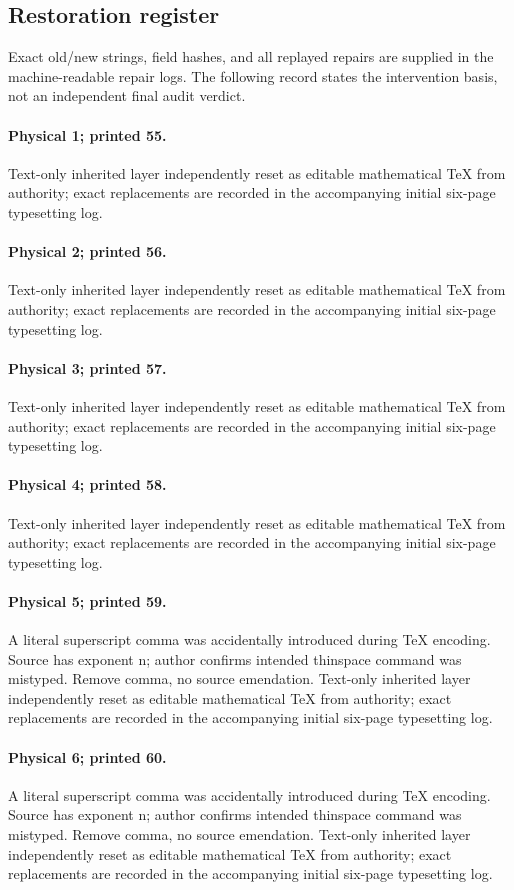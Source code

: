 \documentclass[10pt,a4paper]{article}
\begin{document}
\subsection*{Restoration register}
\noindent Exact old/new strings, field hashes, and all replayed repairs are supplied in the machine-readable repair logs. The following record states the intervention basis, not an independent final audit verdict.\par
\paragraph{Physical 1; printed 55.} Text-only inherited layer independently reset as editable mathematical TeX from authority; exact replacements are recorded in the accompanying initial six-page typesetting log.
\paragraph{Physical 2; printed 56.} Text-only inherited layer independently reset as editable mathematical TeX from authority; exact replacements are recorded in the accompanying initial six-page typesetting log.
\paragraph{Physical 3; printed 57.} Text-only inherited layer independently reset as editable mathematical TeX from authority; exact replacements are recorded in the accompanying initial six-page typesetting log.
\paragraph{Physical 4; printed 58.} Text-only inherited layer independently reset as editable mathematical TeX from authority; exact replacements are recorded in the accompanying initial six-page typesetting log.
\paragraph{Physical 5; printed 59.} A literal superscript comma was accidentally introduced during TeX encoding. Source has exponent n; author confirms intended thinspace command was mistyped. Remove comma, no source emendation. Text-only inherited layer independently reset as editable mathematical TeX from authority; exact replacements are recorded in the accompanying initial six-page typesetting log.
\paragraph{Physical 6; printed 60.} A literal superscript comma was accidentally introduced during TeX encoding. Source has exponent n; author confirms intended thinspace command was mistyped. Remove comma, no source emendation. Text-only inherited layer independently reset as editable mathematical TeX from authority; exact replacements are recorded in the accompanying initial six-page typesetting log.
\end{document}
